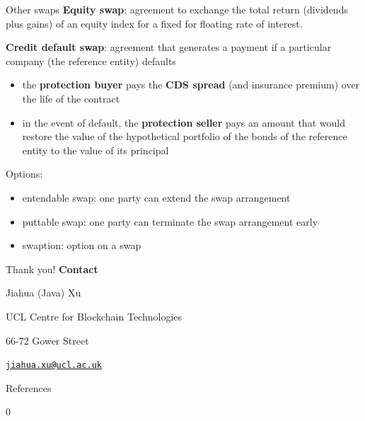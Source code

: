 \documentclass[
  ignorenonframetext,
  aspectratio=169]{beamer}
\providecommand{\tightlist}{%
  \setlength{\itemsep}{0pt}\setlength{\parskip}{0pt}}
\begin{document}
\begin{frame}{Other swaps}
\protect\hypertarget{other-swaps}{}
\textbf{Equity swap}: agreement to exchange the total return (dividends
plus gains) of an equity index for a fixed for floating rate of
interest.

\textbf{Credit default swap}: agreement that generates a payment if a
particular company (the reference entity) defaults

\begin{itemize}
\tightlist
\item
  the \textbf{protection buyer} pays the \textbf{CDS spread} (and
  insurance premium) over the life of the contract
\item
  in the event of default, the \textbf{protection seller} pays an amount
  that would restore the value of the hypothetical portfolio of the
  bonds of the reference entity to the value of its principal
\end{itemize}

Options:

\begin{itemize}
\tightlist
\item
  entendable swap: one party can extend the swap arrangement
\item
  puttable swap: one party can terminate the swap arrangement early
\item
  swaption: option on a swap
\end{itemize}
\end{frame}

\begin{frame}{Thank you!}
\protect\hypertarget{thank-you}{}
\textbf{Contact}

\vspace{0.6cm}

Jiahua (Java) Xu

\vspace{0.4cm}

UCL Centre for Blockchain Technologies

66-72 Gower Street

\vspace{0.4cm}

\href{mailto:jiahua.xu@ucl.ac.uk}{\nolinkurl{jiahua.xu@ucl.ac.uk}}
\end{frame}

\begin{frame}[allowframebreaks]{References}
\protect\hypertarget{references}{}
\small

 0
\end{frame}
\end{document}
